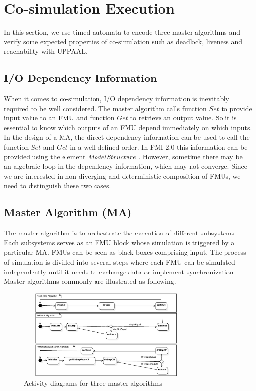 \section{Co-simulation Execution}
\label{sec:ma}
In this section, we use timed automata to encode three master algorithms and verify some expected properties of co-simulation such as deadlock, liveness and reachability with UPPAAL.
\subsection{I/O Dependency Information}
When it comes to co-simulation, I/O dependency information \cite{BromanBGLMTW13} is inevitably required to be well considered. The master algorithm calls function $Set$ to provide input value to an FMU and function $Get$ to retrieve an output value. So it is essential to know which outputs of an FMU depend immediately on which inputs. In the design of a MA, the direct dependency information can be used to call the function $Set$ and $Get$ in a well-defined order. In FMI 2.0 this information can be provided using the element $ModelStructure$ \cite{FMI2INTRO}. However, sometime there may be an algebraic loop in the dependency information, which may not converge. Since we are interested in non-diverging and deterministic composition of FMUs, we need to distinguish these two cases. 
\subsection{Master Algorithm (MA)}
The master algorithm is to orchestrate the execution of different subsystems. Each subsystems serves as an FMU block whose simulation is triggered by a particular MA. FMUs can be seen as black boxes comprising input. The process of simulation is divided into several steps where each FMU can be simulated independently until it needs to exchange data or implement synchronization. Master algorithms commonly are illustrated as following.
\begin{figure}[htbp]
\begin{center}
\includegraphics[width=3.5in,height=1.75in]{fig/MA.jpg}
\caption{Activity diagrams for three master algorithms}
\label{ad-fixedstep}
\end{center}
\end{figure}
